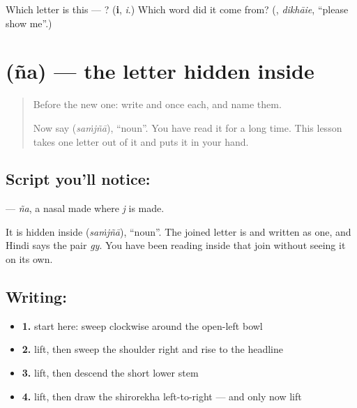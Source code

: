 \begin{tcolorbox}[breakable,colback=teal!4,colframe=teal!35!black,title={Before you move on}]
Which letter is this — ? (\textbf{i}, \emph{i}.) Which word did it come from? (\textbf{}, \emph{dikhāie}, \textquotedblleft{}please show me\textquotedblright{}.)
\end{tcolorbox}
\section[\texorpdfstring{\hi{ञ} (ña)}{ञ (ña)}]{ (ña) — the letter hidden inside }

\label{lesson:HI-W128-letter-nya}



\begin{quote}
Before the new one: write  and  once each, and name them.

Now say \textbf{} (\emph{saṁjñā}), \textquotedblleft{}noun\textquotedblright{}. You have read it for a long time. This lesson takes one letter out of it and puts it in your hand.
\end{quote}

\subsection*{Script you'll notice: }
\textbf{} — \emph{ña}, a nasal made where \emph{j} is made.

It is hidden inside \textbf{} (\emph{saṁjñā}), \textquotedblleft{}noun\textquotedblright{}. The joined letter \textbf{} is \textbf{} and \textbf{} written as one, and Hindi says the pair \emph{gy}. You have been reading \textbf{} inside that join without seeing it on its own.

\subsection*{Writing: }

\begin{itemize}
\raggedright
  \item \textbf{1.} start here: sweep clockwise around the open-left bowl
  \item \textbf{2.} lift, then sweep the shoulder right and rise to the headline
  \item \textbf{3.} lift, then descend the short lower stem
  \item \textbf{4.} lift, then draw the shirorekha left-to-right — and only now lift
\end{itemize}

